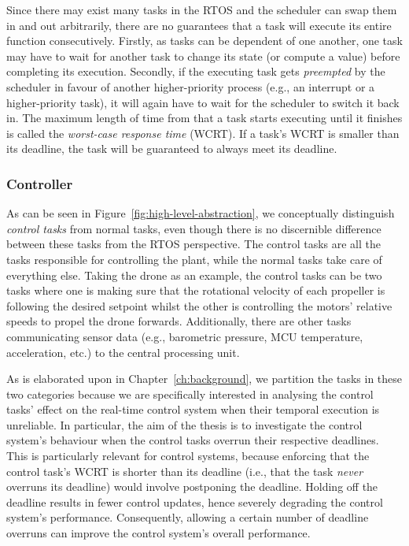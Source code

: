 Since there may exist many tasks in the RTOS and the scheduler can swap them in and out arbitrarily, there are no guarantees that a task will execute its entire function consecutively.
Firstly, as tasks can be dependent of one another, one task may have to wait for another task to change its state (or compute a value) before completing its execution.
Secondly, if the executing task gets \emph{preempted} by the scheduler in favour of another higher-priority process (e.g., an interrupt or a higher-priority task), it will again have to wait for the scheduler to switch it back in.
The maximum length of time from that a task starts executing until it finishes is called the \emph{worst-case response time} (WCRT).
If a task's WCRT is smaller than its deadline, the task will be guaranteed to always meet its deadline.

\subsubsection{Controller}%
%
As can be seen in Figure~\ref{fig:high-level-abstraction}, we conceptually distinguish \emph{control tasks} from normal tasks, even though there is no discernible difference between these tasks from the RTOS perspective.
The control tasks are all the tasks responsible for controlling the plant, while the normal tasks take care of everything else.
Taking the drone as an example, the control tasks can be two tasks where one is making sure that the rotational velocity of each propeller is following the desired setpoint whilst the other is controlling the motors' relative speeds to propel the drone forwards.
Additionally, there are other tasks communicating sensor data (e.g., barometric pressure, MCU temperature, acceleration, etc.) to the central processing unit.

As is elaborated upon in Chapter~\ref{ch:background}, we partition the tasks in these two categories because we are specifically interested in analysing the control tasks' effect on the real-time control system when their temporal execution is unreliable.
In particular, the aim of the thesis is to investigate the control system's behaviour when the control tasks overrun their respective deadlines.
This is particularly relevant for control systems, because enforcing that the control task's WCRT is shorter than its deadline (i.e., that the task \emph{never} overruns its deadline) would involve postponing the deadline.
Holding off the deadline results in fewer control updates, hence severely degrading the control system's performance.
Consequently, allowing a certain number of deadline overruns can improve the control system's overall performance.

